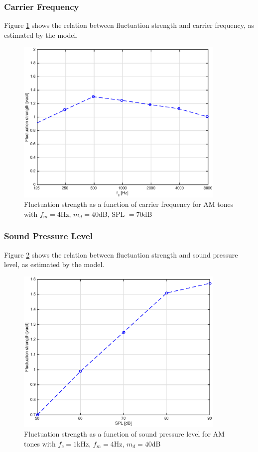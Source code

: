 \documentclass[a4paper]{article}
\begin{document}
\subsubsection{Carrier Frequency}

Figure \ref{fig:AMtonesfcplot} shows the relation between fluctuation strength
and carrier frequency, as estimated by the model.

\begin{figure}[ht]
    \centering
    \includegraphics[height=8cm]{img/am_tones_fc_plot}
    \caption{Fluctuation strength as a function of carrier frequency for AM
        tones with $f_m = 4 $Hz, $m_d = 40 $dB, SPL $= 70 $dB}
    \label{fig:AMtonesfcplot}
\end{figure}

\subsubsection{Sound Pressure Level}

Figure \ref{fig:AMtonesSPLplot} shows the relation between fluctuation strength
and sound pressure level, as estimated by the model.

\begin{figure}[ht]
    \centering
    \includegraphics[height=8cm]{img/am_tones_SPL_plot}
    \caption{Fluctuation strength as a function of sound pressure level for AM
        tones with $f_c = 1 $kHz, $f_m = 4 $Hz, $m_d = 40 $dB}
    \label{fig:AMtonesSPLplot}
\end{figure}
\end{document}

